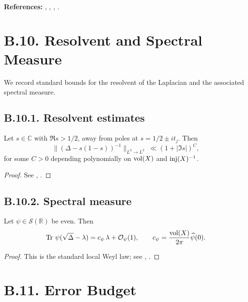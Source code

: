 \medskip
\noindent\textbf{References:} \cite{HejhalI}, \cite{HejhalII}, \cite{IwaniecKowalski}, \cite{Korevaar}.

\section{B.10. Resolvent and Spectral Measure}\label{sec:B10}

We record standard bounds for the resolvent of the Laplacian and the associated spectral measure.

\subsection*{B.10.1. Resolvent estimates}

\begin{lemma}\label{lem:B10-res}
Let $s\in\mathbb{C}$ with $\Re s>1/2$, away from poles at $s=1/2\pm it_j$.
Then
\begin{equation}\label{eq:B10-res}
\|(\Delta-s(1-s))^{-1}\|_{L^2\to L^2}\ \ll (1+|\Im s|)^C,
\end{equation}
for some $C>0$ depending polynomially on $\operatorname{vol}(X)$ and $\operatorname{inj}(X)^{-1}$.
\end{lemma}

\begin{proof}
See \cite[Ch.~6]{HejhalII}, \cite{IwaniecKowalski}.
\end{proof}

\subsection*{B.10.2. Spectral measure}

\begin{lemma}\label{lem:B10-spec}
Let $\psi\in\mathcal{S}(\mathbb{R})$ be even.
Then
\begin{equation}\label{eq:B10-spec}
\operatorname{Tr}\,\psi(\sqrt{\Delta}-\lambda)
= c_\psi\,\lambda+\mathcal{O}_\psi(1),
\qquad
c_\psi=\frac{\operatorname{vol}(X)}{2\pi}\widehat{\psi}(0).
\end{equation}
\end{lemma}

\begin{proof}
This is the standard local Weyl law; see \cite{Sogge}, \cite{HejhalI}.
\end{proof}

\section{B.11. Error Budget}\label{sec:B11}

